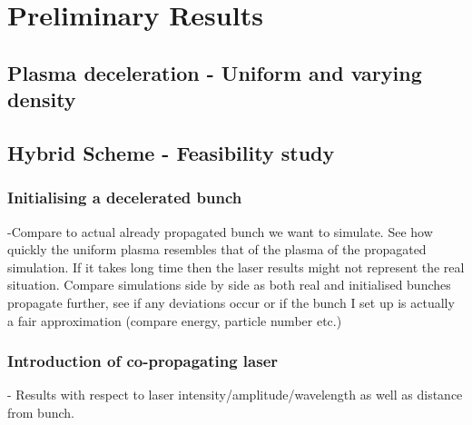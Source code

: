 \chapter{Preliminary Results}
\section{Plasma deceleration - Uniform and varying density}
\section{Hybrid Scheme - Feasibility study}
\subsection{Initialising a decelerated bunch}
-Compare to actual already propagated bunch we want to simulate. See how quickly the uniform plasma resembles that of the plasma of the propagated simulation. If it takes long time then the laser results might not represent the real situation.  Compare simulations side by side as both real and initialised bunches propagate further, see if any deviations occur or if the bunch I set up is actually a fair approximation (compare energy, particle number etc.)
\subsection{Introduction of co-propagating laser}
- Results with respect to laser intensity/amplitude/wavelength as well as distance from bunch.